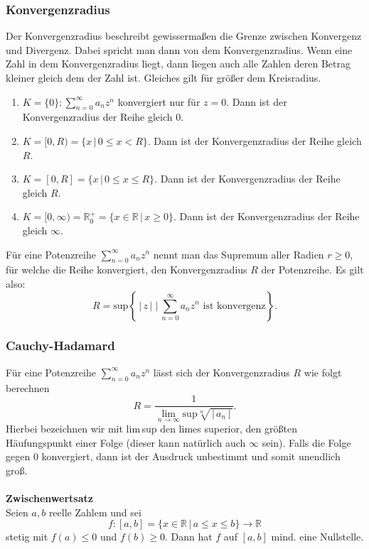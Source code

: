 \documentclass[a4paper,12pt]{article}
\numberwithin{equation}{section}
\begin{document}
\subsubsection{Konvergenzradius}
Der Konvergenzradius beschreibt gewissermaßen die Grenze zwischen Konvergenz und Divergenz. Dabei spricht man dann von dem Konvergenzradius. Wenn eine Zahl in dem Konvergenzradius liegt, dann liegen auch alle Zahlen deren Betrag kleiner gleich dem der Zahl ist. Gleiches gilt für größer dem Kreisradius.
\begin{enumerate}[label=(\alph*)]
        \item $K=\{0\}:\sum_{n=0}^{\infty}a_nz^n$ konvergiert nur für $z=0$. Dann ist der Konvergenzradius der Reihe gleich 0.
        \item $K=[0,R)=\{x\,|\, 0\leq x<R\}$. Dann ist der Konvergenzradius der Reihe gleich $R$.
        \item $K=[0,R]=\{x\,|\, 0\leq x\leq R\}$. Dann ist der Konvergenzradius der Reihe gleich $R$.
        \item $K=[0,\infty)=\mathbb{R}_0^+=\{x \in \mathbb{R}\,|\, x\geq 0\}$. Dann ist der Konvergenzradius der Reihe gleich $\infty$.
\end{enumerate}
Für eine Potenzreihe $\sum_{n=0}^{\infty}a_nz^n$ nennt man das Supremum aller Radien $r\geq 0$, für welche die Reihe konvergiert, den Konvergenzradius $R$ der Potenzreihe. Es gilt also:
\[ 
        R=\text{sup}\left\{\,|\, z\,|\, \,|\, \sum_{n=0}^{\infty}a_nz^n \text{ ist konvergenz}\right\}
.\] 
\subsubsection{Cauchy-Hadamard}
Für eine Potenzreihe $\sum_{n=0}^{\infty}a_nz^n$ lässt sich der Konvergenzradius $R$ wie folgt berechnen
\[ 
        R=\dfrac{1}{\lim_{n\rightarrow \infty}\text{sup}\sqrt[n]{\,|\, a_n\,|\, }}
.\] 
Hierbei bezeichnen wir mit lim\,sup den limes superior, den größten Häufungspunkt einer Folge (dieser kann natürlich auch $\infty$ sein). Falls die Folge gegen $0$ konvergiert, dann ist der Ausdruck unbestimmt und somit unendlich groß.
\\\hfill\\\textbf{Zwischenwertsatz}\\ 
Seien $a,b$ reelle Zahlem und sei
\[ 
        f:[a,b]=\{x \in \mathbb{R}\,|\, a\leq x\leq b\}\rightarrow \mathbb{R}
\] 
stetig mit $f\left(a\right)\leq 0$ und $f\left(b\right)\geq 0$. Dann hat $f$ auf $[a,b]$ mind. eine Nullstelle.
\end{document}
